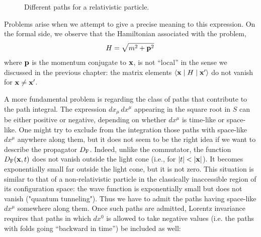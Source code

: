 \begin{figure}[h]
\centering
{}
\caption{Different paths for a relativistic particle.}
\label{fig:relativistic-paths}
\end{figure}

Problems arise when we attempt to give a precise meaning to this expression. On the formal side, we observe that the Hamiltonian associated with the problem,
$$
H = \sqrt{m^2 + {\bf p}^2}\,
$$
where ${\bf p}$ is the momentum conjugate to ${\bf x}$, is not ``local'' in the sense we discussed in the previous chapter: the matrix elements $\langle {\bf x} \mid H \mid {\bf x}' \rangle$ do not vanish for ${\bf x} \neq {\bf x}'$.

A more fundamental problem is regarding the class of paths that contribute to the path integral. The expression $dx_{\mu}\,dx^{\mu}$ appearing in the square root in $S$ can be either positive or negative, depending on whether $dx^{\mu}$ is time-like or space-like. One might try to exclude from the integration those paths with space-like $dx^{\mu}$ anywhere along them, but it does not seem to be the right idea if we want to describe the propagator $D_{\rm F}$. Indeed, unlike the commutator, the function $D_{\rm F}({\bf x},t)$ does not vanish outside the light cone (i.e., for $|t| < |{\bf x}|$). It becomes exponentially small far outside the light cone, but it is not zero. This situation is similar to that of a non-relativistic particle in the classically inaccessible region of its configuration space: the wave function is exponentially small but does not vanish ("quantum tunneling"). Thus we have to admit the paths having space-like $dx^{\mu}$ somewhere along them. Once such paths are admitted, Lorentz invariance requires that paths in which $dx^0$ is allowed to take negative values (i.e. the paths with folds going ``backward in time'') be included as well:

